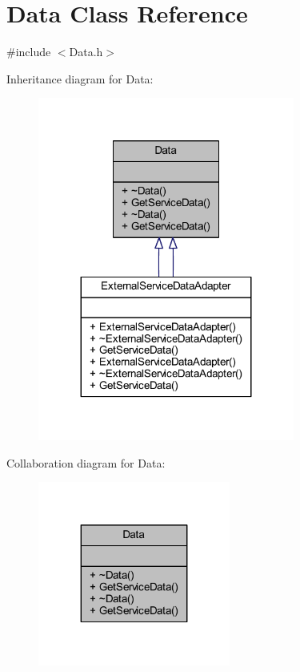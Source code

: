 \hypertarget{class_data}{}\section{Data Class Reference}
\label{class_data}


{\ttfamily \#include $<$Data.\+h$>$}



Inheritance diagram for Data\+:\nopagebreak
\begin{figure}[H]
\begin{center}
\leavevmode
\includegraphics[width=239pt]{class_data__inherit__graph}
\end{center}
\end{figure}


Collaboration diagram for Data\+:\nopagebreak
\begin{figure}[H]
\begin{center}
\leavevmode
\includegraphics[width=179pt]{class_data__coll__graph}
\end{center}
\end{figure}

